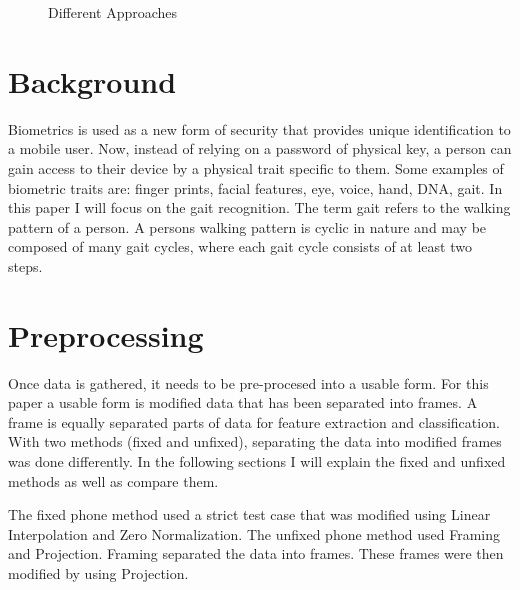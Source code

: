 \documentclass{sig-alternate}
\begin{document}
\begin{figure}
\centering
{}
\caption{Different Approaches}
\label{fig:AlgorithmProcess}
\end{figure}	




\section{Background}
	Biometrics is used as a new form of security that provides unique identification to a mobile user. Now, instead of relying on a password of physical key, a person can gain access to their device by a physical trait specific to them. Some examples of biometric traits are: finger prints, facial features, eye, voice, hand, DNA, gait. In this paper I will focus on the gait recognition. The term gait refers to the walking pattern of a person. A persons walking pattern is cyclic in nature and may be composed of many gait cycles, where each gait cycle consists of at least two steps.~\cite{Sujithra:2012} 


\section{Preprocessing} 
Once data is gathered, it needs to be pre-procesed into a usable form. For this paper a usable form is modified data that has been separated into frames. A frame is equally separated parts of data for feature extraction and classification. With two methods (fixed and unfixed), separating the data into modified frames was done differently. In the following sections I will explain the fixed and unfixed methods as well as compare them.

The fixed phone method used a strict test case that was modified using Linear Interpolation and Zero Normalization. The unfixed phone method used Framing and Projection. Framing separated the data into frames. These frames were then modified by using Projection. 
\end{document}
